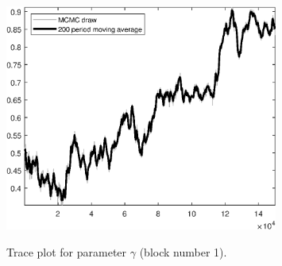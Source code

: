 \begin{figure}[H]
\centering
  \includegraphics[width=0.8\textwidth]{BRS_sectoral_KK/graphs/TracePlot_gam_blck_1}\\
    \caption{Trace plot for parameter $\gamma$ (block number 1).}
\end{figure}
